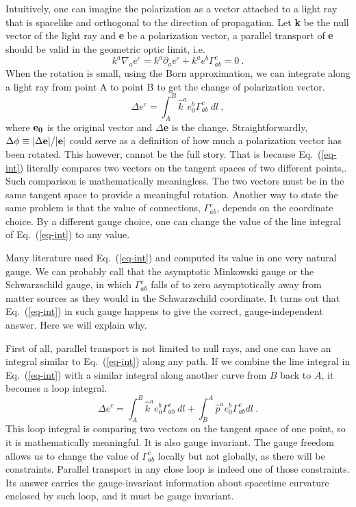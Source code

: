 \documentclass[aps,showpacs,twocolumn,floats,prd,superscriptaddress,nofootinbib]{revtex4-1}
\begin{document}
Intuitively, one can imagine the polarization as a vector attached to a light ray that is spacelike and orthogonal to the direction of propagation. 
Let {\bf k} be the null vector of the light ray and {\bf e} be a polarization vector, a parallel transport of {\bf e} should be valid in the geometric optic limit, i.e.
\begin{equation}
k^a \nabla_a e^c = k^a \partial_a e^c + k^a e^b \Gamma_{ab}^c =0~.
\label{eq-para}
\end{equation}
When the rotation is small, using the Born approximation, we can integrate along a light ray from point A to point B to get the change of polarization vector.
\begin{equation}
\Delta e^c = \int_A^B \hat{k}^a e_0^b \Gamma_{ab}^c~dl~,
\label{eq-int}
\end{equation}
where ${\bf e_0}$ is the original vector and $\Delta${\bf e} is the change. 
Straightforwardly, $\Delta \phi \equiv |\Delta {\bf e}|/|{\bf e}|$ could serve as a definition of how much a polarization vector has been rotated.
This however, cannot be the full story.
That is because Eq.~(\ref{eq-int}) literally compares two vectors on the tangent spaces of two different points,.
Such comparison is mathematically meaningless. 
The two vectors must be in the same tangent space to provide a meaningful rotation. 
Another way to state the same problem is that the value of connections, $\Gamma^c_{ab}$, depends on the coordinate choice.
By a different gauge choice, one can change the value of the line integral of Eq.~(\ref{eq-int}) to any value.

Many literature used Eq.~(\ref{eq-int}) and computed its value in one very natural gauge.
We can probably call that the asymptotic Minkowski gauge or the Schwarzschild gauge, in which $\Gamma_{ab}^c$ falls of to zero asymptotically away from matter sources as they would in the Schwarzschild coordinate.
It turns out that Eq.~(\ref{eq-int}) in such gauge happens to give the correct, gauge-independent answer.
Here we will explain why.

First of all, parallel transport is not limited to null rays, and one can have an integral similar to Eq.~(\ref{eq-int}) along any path. 
If we combine the line integral in Eq.~(\ref{eq-int}) with a similar integral along another curve from $B$ back to $A$, it becomes a loop integral.
\begin{equation}
\Delta e^c = \int_A^B \hat{k}^a e_0^b \Gamma_{ab}^c~dl +
 \int_B^A \hat{p}^a e_0^b \Gamma_{ab}^c dl~.
\label{eq-loop}
\end{equation}
This loop integral is comparing two vectors on the tangent space of one point, so it is mathematically meaningful.
It is also gauge invariant.
The gauge freedom allows us to change the value of $\Gamma_{ab}^c$ locally but not globally, as there will be constraints.
Parallel transport in any close loop is indeed one of those constraints.
Its answer carries the gauge-invariant information about spacetime curvature enclosed by such loop, and it must be gauge invariant.
\end{document}
